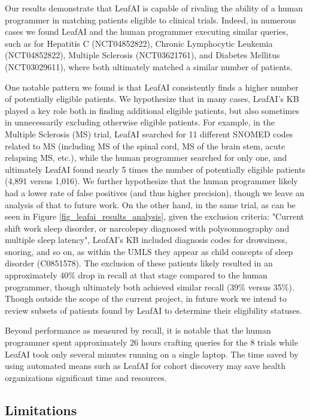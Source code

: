 \documentclass[../main.tex]{subfiles}
\begin{document}
Our results demonstrate that LeafAI is capable of rivaling the ability of a human programmer in matching patients eligible to clinical trials. Indeed, in numerous cases we found LeafAI and the human programmer executing similar queries, such as for Hepatitis C (NCT04852822), Chronic Lymphocytic Leukemia (NCT04852822), Multiple Sclerosis (NCT03621761), and Diabetes Mellitus (NCT03029611), where both ultimately matched a similar number of patients.

One notable pattern we found is that LeafAI consistently finds a higher number of potentially eligible patients. We hypothesize that in many cases, LeafAI's KB played a key role both in finding additional eligible patients, but also sometimes in unnecessarily excluding otherwise eligible patients. For example, in the Multiple Sclerosis (MS) trial, LeafAI searched for 11 different SNOMED codes related to MS (including MS of the spinal cord, MS of the brain stem, acute relapsing MS, etc.), while the human programmer searched for only one, and ultimately LeafAI found nearly 5 times the number of potentially eligible patients (4,891 versus 1,016). We further hypothesize that the human programmer likely had a lower rate of false positives (and thus higher precision), though we leave an analysis of that to future work. On the other hand, in the same trial, as can be seen in Figure \ref{fig_leafai_results_analysis}, given the exclusion criteria: "Current shift work sleep disorder, or narcolepsy diagnosed with polysomnography and multiple sleep latency", LeafAI's KB included diagnosis codes for drowsiness, snoring, and so on, as within the UMLS they appear as child concepts of sleep disorder (C0851578). The exclusion of these patients likely resulted in an approximately 40\% drop in recall at that stage compared to the human programmer, though ultimately both achieved similar recall (39\% versus 35\%). Though outside the scope of the current project, in future work we intend to review subsets of patients found by LeafAI to determine their eligibility statuses. 

Beyond performance as measured by recall, it is notable that the human programmer spent approximately 26 hours crafting queries for the 8 trials while LeafAI took only several minutes running on a single laptop. The time saved by using automated means such as LeafAI for cohort discovery may save health organizations significant time and resources.

\subsection*{Limitations}
\end{document}
